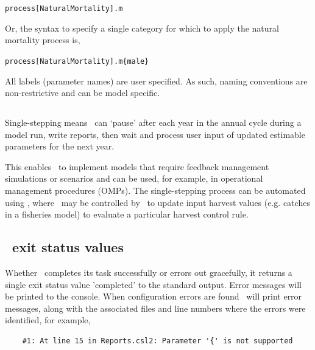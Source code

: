 \texttt{process[NaturalMortality].m}

Or, the syntax to specify a single category for which to apply the natural mortality process is,

\texttt{process[NaturalMortality].m\{male\}}

All labels (parameter names) are user specified. As such, naming conventions are non-restrictive and can be model specific.


\subsection{\label{sec:singlestepping}}

Single-stepping means \CNAME\ can `pause' after each year in the annual cycle during a model run, write reports, then wait and process user input of updated estimable parameters for the next year. 

This enables \CNAME\ to implement models that require feedback management simulations or scenarios and can be used, for example, in operational management procedures (OMPs). The single-stepping process can be automated using \R, where \CNAME\ may be controlled by \R\ to update input harvest values (e.g. catches in a fisheries model) to evaluate a particular harvest control rule. 

\subsection{\CNAME\ exit status values}
Whether \CNAME\ completes its task successfully or errors out gracefully, it returns a single exit status value 'completed' to the standard output. Error messages will be printed to the console. When configuration errors are found \CNAME\ will print error messages, along with the associated files and line numbers where the errors were identified, for example,

{\small{\begin{verbatim}
	#1: At line 15 in Reports.csl2: Parameter '{' is not supported
\end{verbatim}}}	